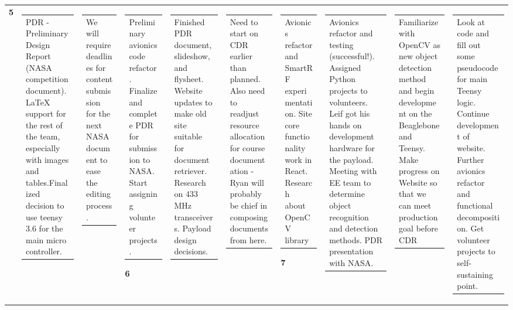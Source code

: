 \documentclass[journal,10pt,draftclsnofoot,onecolumn,compsoc]{IEEEtran} \usepackage[margin=0.75in]{geometry}
\begin{document}
\begin{landscape}
\begin{longtable}{p{1cm}|p{7cm}|p{7cm}|l}
\textbf{5} & \begin{tabular}{p{6.5cm}}PDR - Preliminary Design Report (NASA competition document). LaTeX support for the rest of the team, especially with images and tables.Finalized decision to use teensy 3.6 for the main micro controller. \end{tabular} & \begin{tabular}{p{6.5cm}}We will require deadlines for content submission for the next NASA document to ease the editing process.\end{tabular} & \begin{tabular}{p{6.5cm}}Preliminary avionics code refactor. Finalize and complete PDR for submission to NASA. Start assigning volunteer projects. \end{tabular} \hline

\textbf{6} & \begin{tabular}{p{6.5cm}}Finished PDR document, slideshow, and flysheet. Website updates to make old site suitable for document retriever. Research on 433 MHz transceivers. Payload design decisions. \end{tabular} & \begin{tabular}{p{6.5cm}}Need to start on CDR earlier than planned. Also need to readjust resource allocation for course documentation - Ryan will probably be chief in composing documents from here.\end{tabular} & \begin{tabular}{p{6.5cm}}Avionics refactor and SmartRF experimentation. Site core functionality work in React.Research about OpenCV library\end{tabular} \hline

\textbf{7} & \begin{tabular}{p{6.5cm}}Avionics refactor and testing (successful!). Assigned Python projects to volunteers. Leif got his hands on development hardware for the payload. Meeting with EE team to determine object recognition and detection methods. PDR presentation with NASA. \end{tabular} & \begin{tabular}{p{6.5cm}} Familiarize with OpenCV as new object detection method and begin development on the Beaglebone and Teensy. Make progress on Website so that we can meet production goal before CDR \end{tabular} & \begin{tabular}{p{6.5cm}} Look at code and fill out some pseudocode for main Teensy logic. Continue development of website. Further avionics refactor and functional decomposition. Get volunteer projects to self-sustaining point.\end{tabular} \hline


\end{longtable}
\end{landscape}
\end{document}
